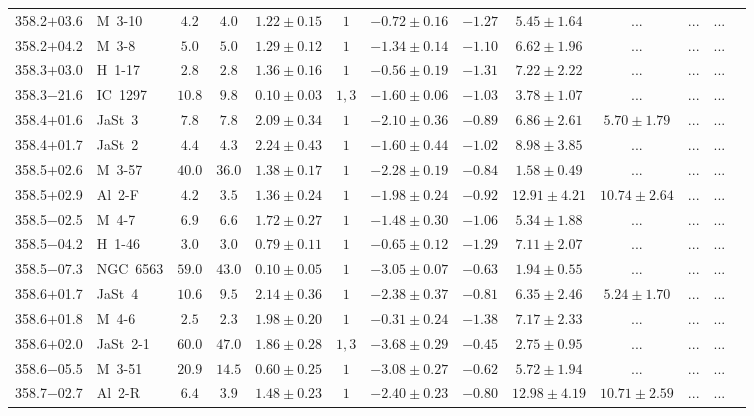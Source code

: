 \documentclass[useAMS]{mn2e}
\begin{document}
\begin{center}
{\begin{longtable}{llccccccccccc}
358.2$+$03.6&M~3-10&$       4.2$&$       4.0$&$1.22 \pm 0.15$&$1$&$-0.72 \pm 0.16$&$     -1.27$&$5.45 \pm 1.64$&$...$&$...$&...\\
358.2$+$04.2&M~3-8&$       5.0$&$       5.0$&$1.29 \pm 0.12$&$1$&$-1.34 \pm 0.14$&$     -1.10$&$6.62 \pm 1.96$&$...$&$...$&...\\
358.3$+$03.0&H~1-17&$       2.8$&$       2.8$&$1.36 \pm 0.16$&$1$&$-0.56 \pm 0.19$&$     -1.31$&$7.22 \pm 2.22$&$...$&$...$&...\\
358.3$-$21.6&IC~1297&$      10.8$&$       9.8$&$0.10 \pm 0.03$&$1,3$&$-1.60 \pm 0.06$&$     -1.03$&$3.78 \pm 1.07$&$...$&$...$&...\\
358.4$+$01.6&JaSt~3&$       7.8$&$       7.8$&$2.09 \pm 0.34$&$1$&$-2.10 \pm 0.36$&$     -0.89$&$6.86 \pm 2.61$&$5.70 \pm 1.79$&$...$&...\\
358.4$+$01.7&JaSt~2&$       4.4$&$       4.3$&$2.24 \pm 0.43$&$1$&$-1.60 \pm 0.44$&$     -1.02$&$8.98 \pm 3.85$&$...$&$...$&...\\
358.5$+$02.6&M~3-57&$      40.0$&$      36.0$&$1.38 \pm 0.17$&$1$&$-2.28 \pm 0.19$&$     -0.84$&$1.58 \pm 0.49$&$...$&$...$&...\\
358.5$+$02.9&Al~2-F&$       4.2$&$       3.5$&$1.36 \pm 0.24$&$1$&$-1.98 \pm 0.24$&$     -0.92$&$12.91 \pm 4.21$&$10.74 \pm 2.64$&$...$&...\\
358.5$-$02.5&M~4-7&$       6.9$&$       6.6$&$1.72 \pm 0.27$&$1$&$-1.48 \pm 0.30$&$     -1.06$&$5.34 \pm 1.88$&$...$&$...$&...\\
358.5$-$04.2&H~1-46&$       3.0$&$       3.0$&$0.79 \pm 0.11$&$1$&$-0.65 \pm 0.12$&$     -1.29$&$7.11 \pm 2.07$&$...$&$...$&...\\
358.5$-$07.3&NGC~6563&$      59.0$&$      43.0$&$0.10 \pm 0.05$&$1$&$-3.05 \pm 0.07$&$     -0.63$&$1.94 \pm 0.55$&$...$&$...$&...\\
358.6$+$01.7&JaSt~4&$      10.6$&$       9.5$&$2.14 \pm 0.36$&$1$&$-2.38 \pm 0.37$&$     -0.81$&$6.35 \pm 2.46$&$5.24 \pm 1.70$&$...$&...\\
358.6$+$01.8&M~4-6&$       2.5$&$       2.3$&$1.98 \pm 0.20$&$1$&$-0.31 \pm 0.24$&$     -1.38$&$7.17 \pm 2.33$&$...$&$...$&...\\
358.6$+$02.0&JaSt~2-1&$      60.0$&$      47.0$&$1.86 \pm 0.28$&$1,3$&$-3.68 \pm 0.29$&$     -0.45$&$2.75 \pm 0.95$&$...$&$...$&...\\
358.6$-$05.5&M~3-51&$      20.9$&$      14.5$&$0.60 \pm 0.25$&$1$&$-3.08 \pm 0.27$&$     -0.62$&$5.72 \pm 1.94$&$...$&$...$&...\\
358.7$-$02.7&Al~2-R&$       6.4$&$       3.9$&$1.48 \pm 0.23$&$1$&$-2.40 \pm 0.23$&$     -0.80$&$12.98 \pm 4.19$&$10.71 \pm 2.59$&$...$&...\\

\end{longtable}}
\end{center}
\end{document}

